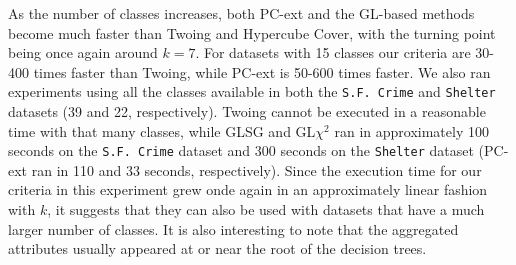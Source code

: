 As the number of classes increases, both PC-ext and the GL-based methods become much faster than Twoing and Hypercube Cover, with the turning point being once again around $k=7$. For datasets with 15 classes our criteria are 30-400 times faster than Twoing, while PC-ext is 50-600 times faster. We also ran experiments using all the classes available in both the {\tt S.F. Crime} and {\tt Shelter} datasets (39 and 22, respectively). Twoing cannot be executed in a reasonable time with that many classes, while GLSG and GL$\chi^2$ ran in approximately 100 seconds on the {\tt S.F. Crime} dataset and  300 seconds on the {\tt Shelter} dataset (PC-ext ran in 110 and 33 seconds, respectively). Since the execution time for our criteria in this experiment grew onde again in an approximately linear fashion with $k$, it suggests that they can also be used with datasets that have a much larger number of classes. It is also interesting to note that the aggregated attributes usually appeared at or near the root of the decision trees.

